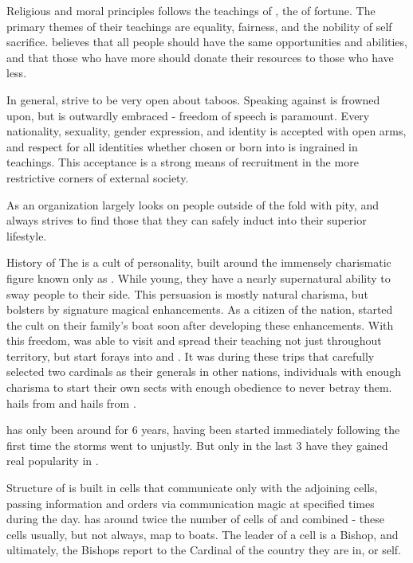 \documentclass[blue]{GL2020}
\begin{document}
\name{\bAgrarian{}}

Religious and moral principles
\pCult follows the teachings of \cCultGod, the \cCultGod{\god} of fortune. The primary themes of their teachings are equality, fairness, and the nobility of self sacrifice. \pCult believes that all people should have the same opportunities and abilities, and that those who have more should donate their resources to those who have less. 

In general, \pCult strive to be very open about taboos. Speaking against \pCult is frowned upon, but is outwardly embraced - freedom of speech is paramount. Every nationality, sexuality, gender expression, and identity is accepted with open arms, and respect for all identities whether chosen or born into is ingrained in \pCult teachings. This acceptance is a strong means of recruitment in the more restrictive corners of external society.

As an organization \pCult largely looks on people outside of the fold with pity, and always strives to find those that they can safely induct into their superior lifestyle.

History of \pCult
The \pCult is a cult of personality, built around the immensely charismatic figure known only as \cCultLeader. While young, they have a nearly supernatural ability to sway people to their side. This persuasion is mostly natural charisma, but bolsters by signature magical enhancements. As a citizen of the \pViking nation, \cCultLeader started the cult on their family's boat soon after developing these enhancements. With this freedom, \cCultLeader{\they} was able to visit and spread their teaching not just throughout \pViking territory, but start forays into \pTech and \pFarm. It was during these trips that \cCultLeader carefully selected two cardinals as their generals in other nations, individuals with enough charisma to start their own sects with enough obedience to never betray them. \cTechCardinal hails from \pTech and \cFarmCardinal hails from \pFarm.

\pCult has only been around for 6 years, having been started immediately following the first time the storms went to \pViking unjustly. But only in the last 3 have they gained real popularity in \pViking.

Structure of \cCult
\cCult is built in cells that communicate only with the adjoining cells, passing information and orders via communication magic at specified times during the day. \pViking has around twice the number of cells of \pTech and \pFarm combined - these cells usually, but not always, map to boats. The leader of a cell is a Bishop, and ultimately, the Bishops report to the Cardinal of the country they are in, or \cCultLeader \cCultLeader{\them}self.
\end{document}
